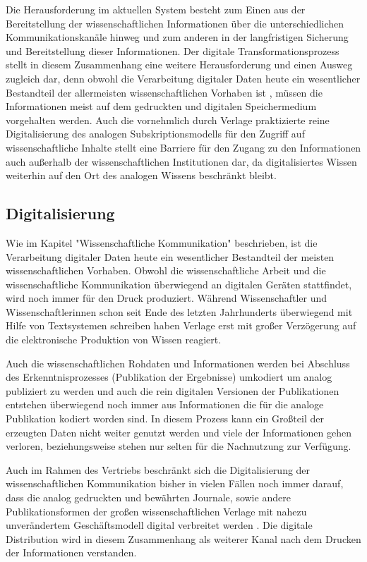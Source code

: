 Die Herausforderung im aktuellen System besteht zum Einen aus der Bereitstellung der wissenschaftlichen Informationen über die unterschiedlichen Kommunikationskanäle hinweg und zum anderen in der langfristigen Sicherung und Bereitstellung dieser Informationen. Der digitale Transformationsprozess stellt in diesem Zusammenhang eine weitere Herausforderung und einen Ausweg zugleich dar, denn obwohl die Verarbeitung digitaler Daten heute ein wesentlicher Bestandteil der allermeisten wissenschaftlichen Vorhaben ist \cite{winkler_2011_anforderungen}, müssen die Informationen meist auf dem gedruckten und digitalen Speichermedium vorgehalten werden. Auch die vornehmlich durch Verlage praktizierte reine Digitalisierung des analogen Subskriptionsmodells für den Zugriff auf wissenschaftliche Inhalte \cite{Hanekop_2014} \cite{boai_2012} stellt eine Barriere für den Zugang zu den Informationen auch außerhalb der wissenschaftlichen Institutionen dar, da digitalisiertes Wissen weiterhin auf den Ort des analogen Wissens beschränkt bleibt.

\subsection{Digitalisierung}

Wie im Kapitel "Wissenschaftliche Kommunikation" beschrieben, ist die Verarbeitung digitaler Daten heute ein wesentlicher Bestandteil der meisten wissenschaftlichen Vorhaben. Obwohl die wissenschaftliche Arbeit und die wissenschaftliche Kommunikation überwiegend an digitalen Geräten stattfindet, wird noch immer für den Druck produziert. Während Wissenschaftler und Wissenschaftlerinnen schon seit Ende des letzten Jahrhunderts überwiegend mit Hilfe von Textsystemen schreiben \cite{Brueggemann-Klein_1995} \cite{bjork_2004_open} haben Verlage erst mit großer Verzögerung auf die elektronische Produktion von Wissen reagiert.

Auch die wissenschaftlichen Rohdaten und Informationen werden bei Abschluss des Erkenntnisprozesses (Publikation der Ergebnisse) umkodiert um analog publiziert zu werden und auch die rein digitalen Versionen der Publikationen entstehen überwiegend noch immer aus Informationen die für die analoge Publikation kodiert worden sind. In diesem Prozess kann ein Großteil der erzeugten Daten nicht weiter genutzt werden und viele der Informationen gehen verloren, beziehungsweise stehen nur selten für die Nachnutzung zur Verfügung.

Auch im Rahmen des Vertriebs beschränkt sich die Digitalisierung der wissenschaftlichen Kommunikation bisher in vielen Fällen noch immer darauf, dass die analog gedruckten und bewährten Journale, sowie andere Publikationsformen der großen wissenschaftlichen Verlage mit nahezu unverändertem Geschäftsmodell digital verbreitet werden \cite{Hanekop_2014} \cite[:179]{Fehling_2014}. Die digitale Distribution wird in diesem Zusammenhang als weiterer Kanal nach dem Drucken der Informationen verstanden.

